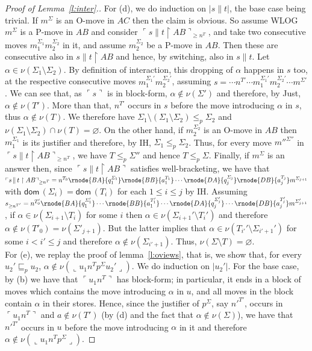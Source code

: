 \documentclass{CSML}
\theoremstyle{definition}\newtheorem{definition}[thm]{Definition}
\theoremstyle{definition}\newtheorem{example}[thm]{Example}
\theoremstyle{definition}\newtheorem{proposition}[thm]{Proposition}
\theoremstyle{definition}\newtheorem{lemma}[thm]{Lemma}
\theoremstyle{definition}\newtheorem{theorem}[thm]{Theorem}
\theoremstyle{definition}\newtheorem{corollary}[thm]{Corollary}
\theoremstyle{definition}\newtheorem{remark}[thm]{Remark}
\renewcommand\Sigma{\varSigma}
\newcommand\Tau{T}
\newcommand\ov[1]{\llcorner{#1}\lrcorner}
\newcommand\rest{\upharpoonright}
\newcommand\iseq{\mathop{\|}}
\newcommand\remv{\setminus}
\newcommand\dom[1]{\mathsf{dom}\,#1}
\newcommand\Substore{\leq_p}
\newcommand\prefix{\sqsubseteq_p}
\newcommand\pview[1]{\ulcorner{#1}\urcorner}
\newcommand\pv[1]{\pview{#1}}
\newcommand\na\alpha
\begin{document}
\begin{proof}[Proof of Lemma~\ref{l:inter}.]
For (d), we do induction on $|s\iseq t|$, the base case being trivial. If $m^\Sigma$ is an O-move in $AC$ then the claim is obvious. So assume WLOG $m^\Sigma$ is a P-move in $AB$ and consider $\pv{s\iseq t\rest AB}_{\geq n^\Tau}$, and take two consecutive moves $m_1^{\Sigma_1}m_2^{\Sigma_2}$ in it, and assume $m_2^{\Sigma_2}$ be a P-move in $AB$. Then these are consecutive also in $s\iseq t\rest AB$ and hence, by switching, also in $s\iseq t$. Let $\na\in\nu(\Sigma_1\remv\Sigma_2)$. By definition of interaction, this dropping of $\na$ happens in $s$ too, at the respective consecutive moves  $m_1^{\Sigma_1'}m_2^{\Sigma_2'}$, assuming $s=\cdots n^{\Tau'}\cdots m_1^{\Sigma_1'}m_2^{\Sigma_2'}\cdots m^{\Sigma'}$. We can see that, as $\pv{s}$ is in block-form, $\na\notin\nu(\Sigma')$ and therefore, by Just, $\na\notin\nu(\Tau')$. More than that, $n^{\Tau'}$ occurs in $s$ before the move introducing $\na$ in $s$, thus $\na\notin\nu(\Tau)$. We therefore have $\Sigma_1\remv(\Sigma_1\remv\Sigma_2)\Substore\Sigma_2$ and $\nu(\Sigma_1\remv\Sigma_2)\cap\nu(\Tau)=\varnothing$. On the other hand, if $m_2^{\Sigma_2}$ is an O-move in $AB$ then $m_1^{\Sigma_1}$ is its justifier and therefore, by IH, $\Sigma_1\Substore\Sigma_2$. Thus, for every move $m''^{\Sigma''}$ in $\pv{s\iseq t\rest AB}_{\geq n^\Tau}$, we have $\Tau\Substore\Sigma''$ and hence $\Tau\Substore\Sigma$. Finally, if $m^\Sigma$ is an answer then, since $\pv{s\iseq t\rest AB}$ satisfies well-bracketing, we have that $\pv{s\iseq t\rest AB}_{\geq n^\Tau}=n^{\Tau_0}\rnode{BA}{q_{1}^{\Sigma_1}}\rnode{BB}{a_{1}^{\Tau_1}}
\cdots\rnode{DA}{q_{j}^{\Sigma_j}}\rnode{DB}{a_{j}^{\Tau_j}}m^{\Sigma_{j+1}}$
with $\dom(\Sigma_i)=\dom(\Tau_i)$ for each $1\leq i\leq j$ by IH. Assuming $s_{\geq
n^{\Tau'}}=n^{\Tau_0'}\rnode{BA}{q_{1}^{\Sigma_1'}}\cdots\rnode{BB}{a_{1}^{\Tau_1'}}\cdots\rnode{DA}{q_{j}^{\Sigma_j'}}
\cdots\rnode{DB}{a_{j}^{\Tau_j'}}m^{\Sigma_{j+1}'}$, if $\na\in\nu(\Sigma_{i+1}\remv\Tau_i)$ for some $i$ then $\na\in\nu(\Sigma_{i+1}'\remv\Tau_i')$ and therefore $\na\notin\nu(\Tau'_0)=\nu(\Sigma'_{j+1})$. But the latter implies that $\na\in\nu(\Tau_{i'}'\remv\Sigma_{i'+1}')$ for some $i<i'\leq j$ and therefore $\na\notin\nu(\Sigma_{i'+1})$. Thus, $\nu(\Sigma\remv\Tau)=\varnothing$.
\\
For (e), we replay the proof of lemma~\ref{l:oviews}, that is, we show that, for every $u_2'\prefix u_2$, $\na\notin\nu(\ov{u_1n^\Tau p^\Sigma u_2'})$. We do induction on $|u_2'|$. For the base case, by (b) we have that $\pv{u_1n^\Tau}$ has block-form; in particular, it ends in a block of moves which contains the move introducing $\na$ in $u$, and all moves in the block contain $\na$ in their stores. Hence, since the justifier of $p^\Sigma$, say $n'^{\Tau'}$, occurs in $\pv{u_1n^\Tau}$ and $a\notin\nu(\Tau')$ (by (d) and the fact that $\na\notin\nu(\Sigma)$), we have that $n'^{\Tau'}$ occurs in $u$ before the move introducing $\na$ in it and therefore $\na\notin\nu(\ov{u_1n^\Tau p^\Sigma})$.

\end{proof}
\end{document}
